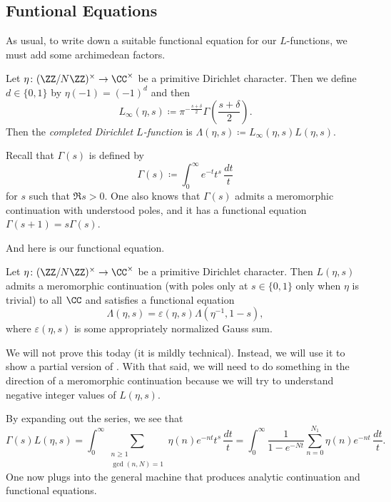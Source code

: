 \documentclass{article}
\begin{document}
\subsection{Funtional Equations}
As usual, to write down a suitable functional equation for our $L$-functions, we must add some archimedean factors.
\begin{definition}
	Let $\eta\colon(\ZZ/N\ZZ)^\times\to\CC^\times$ be a primitive Dirichlet character. Then we define $d\in\{0,1\}$ by $\eta(-1)=(-1)^d$ and then
	\[L_\infty(\eta,s)\coloneqq\pi^{-\frac{s+\delta}2}\Gamma\left(\frac{s+\delta}2\right).\]
	Then the \textit{completed Dirichlet $L$-function} is $\Lambda(\eta,s)\coloneqq L_\infty(\eta,s)L(\eta,s)$.
\end{definition}
\begin{remark}
	Recall that $\Gamma(s)$ is defined by
	\[\Gamma(s)\coloneqq\int_0^\infty e^{-t}t^s\,\frac{dt}t\]
	for $s$ such that $\Re s>0$. One also knows that $\Gamma(s)$ admits a meromorphic continuation with understood poles, and it has a functional equation $\Gamma(s+1)=s\Gamma(s)$.
\end{remark}
And here is our functional equation.
\begin{theorem} \label{thm:dirichlet-functional-equation}
	Let $\eta\colon(\ZZ/N\ZZ)^\times\to\CC^\times$ be a primitive Dirichlet character. Then $L(\eta,s)$ admits a meromorphic continuation (with poles only at $s\in\{0,1\}$ only when $\eta$ is trivial) to all $\CC$ and satisfies a functional equation
	\[\Lambda(\eta,s)=\varepsilon(\eta,s)\Lambda\left(\eta^{-1},1-s\right),\]
	where $\varepsilon(\eta,s)$ is some appropriately normalized Gauss sum.
\end{theorem}
We will not prove this today (it is mildly technical). Instead, we will use it to show a partial version of . With that said, we will need to do something in the direction of a meromorphic continuation because we will try to understand negative integer values of $L(\eta,s)$.

By expanding out the series, we see that
\[\Gamma(s)L(\eta,s)=\int_0^\infty\sum_{\substack{n\ge1\\\gcd(n,N)=1}}\eta(n)e^{-nt}t^s\,\frac{dt}t=\int_0^\infty\frac1{1-e^{-Nt}}\sum_{n=0}^{N_1}\eta(n)e^{-nt}\,\frac{dt}t.\]
One now plugs into the general machine that produces analytic continuation and functional equations.
\end{document}

